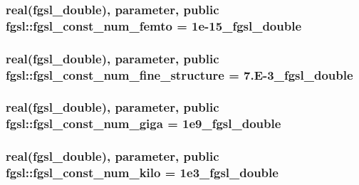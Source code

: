 \subsubsection[{fgsl\+\_\+const\+\_\+num\+\_\+femto}]{\setlength{\rightskip}{0pt plus 5cm}real({\bf fgsl\+\_\+double}), parameter, public fgsl\+::fgsl\+\_\+const\+\_\+num\+\_\+femto = 1e-\/15\+\_\+fgsl\+\_\+double}\label{namespacefgsl_a3ab8d745c9129ec33f7556e68234b60b}
\hypertarget{namespacefgsl_aa12fc22d559b707d7e1e63ac17c596cb}{}
\subsubsection[{fgsl\+\_\+const\+\_\+num\+\_\+fine\+\_\+structure}]{\setlength{\rightskip}{0pt plus 5cm}real({\bf fgsl\+\_\+double}), parameter, public fgsl\+::fgsl\+\_\+const\+\_\+num\+\_\+fine\+\_\+structure = 7.\+E-\/3\+\_\+fgsl\+\_\+double}\label{namespacefgsl_aa12fc22d559b707d7e1e63ac17c596cb}
\hypertarget{namespacefgsl_a27758acec15033cf3c0918d8d9c55eca}{}
\subsubsection[{fgsl\+\_\+const\+\_\+num\+\_\+giga}]{\setlength{\rightskip}{0pt plus 5cm}real({\bf fgsl\+\_\+double}), parameter, public fgsl\+::fgsl\+\_\+const\+\_\+num\+\_\+giga = 1e9\+\_\+fgsl\+\_\+double}\label{namespacefgsl_a27758acec15033cf3c0918d8d9c55eca}
\hypertarget{namespacefgsl_a921e5869ad16238cb472943f2486d0ac}{}
\subsubsection[{fgsl\+\_\+const\+\_\+num\+\_\+kilo}]{\setlength{\rightskip}{0pt plus 5cm}real({\bf fgsl\+\_\+double}), parameter, public fgsl\+::fgsl\+\_\+const\+\_\+num\+\_\+kilo = 1e3\+\_\+fgsl\+\_\+double}\label{namespacefgsl_a921e5869ad16238cb472943f2486d0ac}
\hypertarget{namespacefgsl_a3783a70eb7db5888129ccf2094415129}{}
